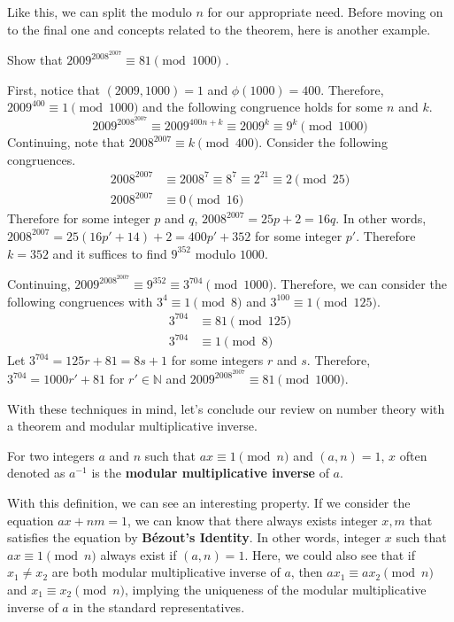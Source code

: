 \documentclass[../../main.tex]{subfiles}
\begin{document}
Like this, we can split the modulo $n$ for our appropriate need.
Before moving on to the final one and concepts related to the
theorem, here is another example.

\begin{problem}{}{}
Show that $2009^{2008^{2007}} \equiv 81 \pmod{1000}$ \cite{MATH01-5}.
\end{problem}
\begin{solution}
First, notice that $(2009, 1000) = 1$ and $\phi(1000) = 400$.
Therefore, $2009^{400} \equiv 1 \pmod{1000}$ and the following
congruence holds for some $n$ and $k$.
\[
2009^{2008^{2007}}
\equiv 2009^{400n + k}
\equiv 2009^{k}
\equiv 9^k \pmod{1000}
\]
Continuing, note that $2008^{2007} \equiv k \pmod{400}$.
Consider the following congruences.
\begin{align*}
    2008^{2007} &\equiv 2008^7 \equiv 8^7 \equiv 2^{21}
        \equiv 2 \pmod{25} \\
    2008^{2007} &\equiv 0 \pmod{16}
\end{align*}
Therefore for some integer $p$ and $q$, $2008^{2007} = 25p + 2
= 16q$. In other words, $2008^{2007} = 25(16p' + 14) + 2
= 400p' + 352$ for some integer $p'$. Therefore $k = 352$ and
it suffices to find $9^{352}$ modulo $1000$.

Continuing, $2009^{2008^{2007}} \equiv 9^{352} \equiv 3^{704}
\pmod{1000}$. Therefore, we can consider the following congruences
with $3^4 \equiv 1 \pmod{8}$ and $3^{100} \equiv 1 \pmod{125}$.
\begin{align*}
    3^{704} &\equiv 81 \pmod{125} \\
    3^{704} &\equiv 1 \pmod{8}
\end{align*}
Let $3^{704} = 125r + 81 = 8s + 1$ for some integers $r$ and $s$.
Therefore, $3^{704} = 1000r' + 81$ for $r' \in \mathbb{N}$ and
$2009^{2008^{2007}} \equiv 81 \pmod{1000}$.
\end{solution}

With these techniques in mind, let's conclude our review on
number theory with a theorem and modular multiplicative inverse.

\begin{definition}{}{}
For two integers $a$ and $n$ such that $a x \equiv 1 \pmod{n}$
and $(a, n) = 1$, $x$ often denoted as $a^{-1}$ is the
\textbf{modular multiplicative inverse} of $a$.
\end{definition}

With this definition, we can see an interesting property.
If we consider the equation $ax + nm = 1$, we can know that there
always exists integer $x, m$ that satisfies the equation by
\textbf{Bézout's Identity}. In other words, integer $x$ such that
$ax \equiv 1 \pmod{n}$ always exist if $(a, n) = 1$. Here, we could
also see that if $x_1 \neq x_2$ are both modular multiplicative
inverse of $a$, then $ax_1 \equiv ax_2 \pmod{n}$ and
$x_1 \equiv x_2 \pmod{n}$, implying the uniqueness of the modular
multiplicative inverse of $a$ in the standard representatives.
\end{document}

